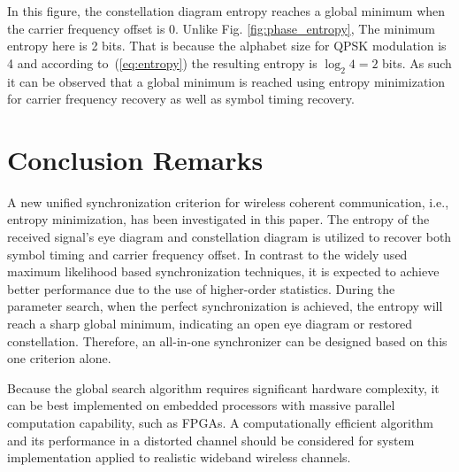 \documentclass[journal,comsoc]{IEEEtran}
\begin{document}
In this figure, the constellation diagram entropy reaches a global minimum when the carrier frequency offset is 0.
Unlike Fig. \ref{fig:phase_entropy}, The minimum entropy here is 2 bits.
That is because the alphabet size for QPSK modulation is 4 and according to~(\ref{eq:entropy}) the resulting entropy is \(\log_2 {4}=2\) bits.
As such it can be observed that a global minimum is reached using entropy minimization for carrier frequency recovery as well as symbol timing recovery. 

\section{Conclusion Remarks}
\label{sec:conc}
A new unified synchronization criterion for wireless coherent communication, i.e., entropy minimization, has been investigated in this paper. 
The entropy of the received signal's eye diagram and constellation diagram is utilized to recover both symbol timing and carrier frequency offset.
In contrast to the widely used maximum likelihood based synchronization techniques, it is expected to achieve better performance due to the use of higher-order statistics.
During the parameter search, when the perfect synchronization is achieved, the entropy will reach a sharp global minimum, indicating an open eye diagram or restored constellation. 
Therefore, an all-in-one synchronizer can be designed based on this one criterion alone. 

Because the global search algorithm requires significant hardware complexity, it can be best implemented on embedded processors with massive parallel computation capability, such as FPGAs.  
A computationally efficient algorithm and its performance in a distorted channel should be considered for system implementation applied to realistic wideband wireless channels.




\small


\end{document}
